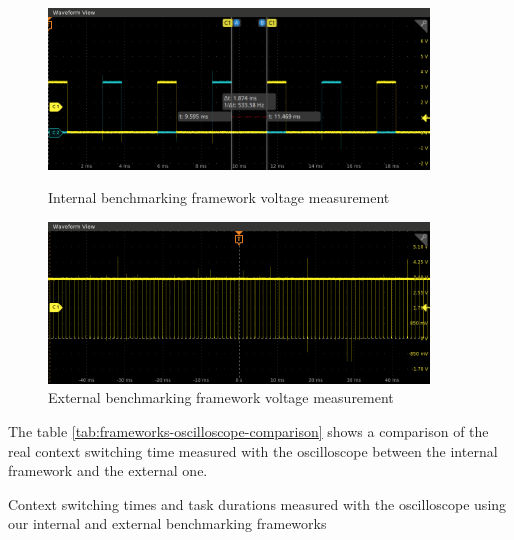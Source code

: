 \begin{figure}[!ht]
  \centering

  \begin{minipage}{0.45\textwidth}
    \includegraphics[width=0.9\textwidth]{assets/framework-value-wave.png}
    \caption{\label{fig:internal-framework-value-wave}Internal benchmarking framework voltage measurement}

  \end{minipage}\hfill
  \begin{minipage}{0.45\textwidth}

    \includegraphics[width=0.9\textwidth]{assets/external-framework-value-wave.png}
    \caption{\label{fig:external-framework-value-wave}External benchmarking framework voltage measurement}

  \end{minipage}
\end{figure}

The table \ref{tab:frameworks-oscilloscope-comparison} shows a comparison of the real context switching time measured with the oscilloscope between the internal framework and the external one.

\begin{table}[!ht]
  \centering
  
  \caption{Context switching times and task durations measured with the oscilloscope using our internal and external benchmarking frameworks}
  \label{tab:frameworks-oscilloscope-comparison}
\end{table}
